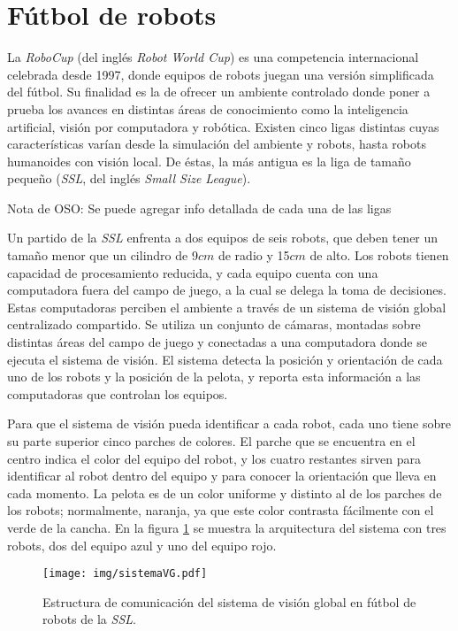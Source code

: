 
\section{Fútbol de robots}

La \emph{RoboCup}\cite{robocupHist} (del inglés \emph{Robot World Cup}) es una
competencia internacional celebrada desde 1997, donde equipos de robots juegan
una versión simplificada del fútbol. Su finalidad es la de ofrecer un ambiente
controlado donde poner a prueba los avances en distintas áreas de conocimiento
como la inteligencia artificial, visión por computadora y robótica. Existen
cinco ligas distintas cuyas características varían desde la simulación del
ambiente y robots, hasta robots humanoides con visión local. De éstas, la más
antigua es la liga de tamaño pequeño (\emph{SSL}, del inglés \emph{Small Size
League}).

Nota de OSO: Se puede agregar info detallada de cada una de las ligas

Un partido de la \emph{SSL} enfrenta a dos equipos de seis robots, que deben
tener un tamaño menor que un cilindro de 9$cm$ de radio y 15$cm$ de
alto\cite{sslrules2015}. Los robots tienen capacidad de procesamiento reducida,
y cada equipo cuenta con una computadora fuera del campo de juego, a la cual se
delega la toma de decisiones. Estas computadoras perciben el ambiente a través
de un sistema de visión global centralizado compartido. Se utiliza un conjunto
de cámaras, montadas sobre distintas áreas del campo de juego y conectadas a una
computadora donde se ejecuta el sistema de visión. El sistema detecta la
posición y orientación de cada uno de los robots y la posición de la pelota, y
reporta esta información a las computadoras que controlan los equipos.

Para que el sistema de visión pueda identificar a cada robot, cada uno tiene
sobre su parte superior cinco parches de colores. El parche que se encuentra
en el centro indica el color del equipo del robot, y los cuatro restantes
sirven para identificar al robot dentro del equipo y para conocer la
orientación que lleva en cada momento. La pelota es de un color uniforme y
distinto al de los parches de los robots; normalmente, naranja, ya que este
color contrasta fácilmente con el verde de la cancha. En la figura
\ref{sistemaVG} se muestra la arquitectura del sistema con tres robots, dos
del equipo azul y uno del equipo rojo.

\begin{figure}[!h]

	\texttt{[image: img/sistemaVG.pdf]}

	\caption{Estructura de comunicación del sistema de visión global en
	fútbol de robots de la \emph{SSL}.}

	\label{sistemaVG}

\end{figure}

